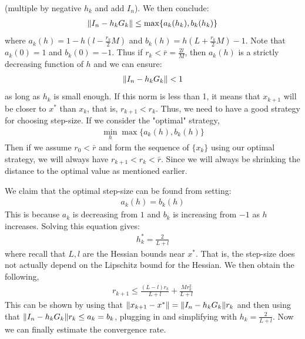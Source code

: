 \documentclass[12pt,a4paper]{article}
\begin{document}
	(multiple by negative $h_k$ and add $I_n$). We then conclude:
	\begin{align*}
		\norm{I_n - h_kG_k} \leq \max\{a_k(h_k), b_k(h_k)\}
	\end{align*}
	where $a_k(h) = 1 - h(l - \frac{r_k}{2}M)$ and $b_k(h) = h(L + \frac{r_k}{2}M) - 1$. 
	Note that $a_k(0) = 1$ and $b_k(0) = -1$. Thus if $r_k < \bar{r} = \frac{2l}{M}$, then $a_k(h)$ is a strictly decreasing function of $h$ and we can ensure:
	\begin{align*}
		\norm{I_n - h_kG_k} < 1
	\end{align*}
	as long as $h_k$ is small enough. If this norm is less than 1, it means that $x_{k+1}$ will be closer to $x^*$ than $x_k$, that is, $r_{k+1} < r_k$. Thus, we need to have a good strategy for choosing step-size. If we consider the "optimal" strategy,
	\begin{align*}
		\min_h \max\{a_k(h),b_k(h)\}
	\end{align*}
	Then if we assume $r_0 < \bar{r}$ and form the sequence of $\{x_k\}$ using our optimal strategy, we will always have $r_{k+1} < r_k < \bar{r}$. Since we will always be shrinking the distance to the optimal value as mentioned earlier. 
	
	We claim that the optimal step-size can be found from setting:
	\begin{align*}
		a_k(h) = b_k(h)
	\end{align*}
	This is because $a_k$ is decreasing from $1$ and $b_k$ is increasing from $-1$ as $h$ increases. Solving this equation gives:
	\begin{align*}
		h_k^* = \frac{2}{L+l}
	\end{align*}
	where recall that $L,l$ are the Hessian bounds near $x^*$. That is, the step-size does not actually depend on the Lipschitz bound for the Hessian. We then obtain the following,
	\begin{align*}
		r_{k+1} \leq \frac{(L-l)r_k}{L+l}+ \frac{Mr_k^2}{L+l}
	\end{align*}
	This can be shown by using that $\norm{x_{k+1} - x^*} = \norm{I_n - h_kG_k}r_k$ and then using that $\norm{I_n - h_kG_k}r_k \leq a_k = b_k$, plugging in and simplifying with $h_k = \frac{2}{L+l}$. Now we can finally estimate the convergence rate.
	
\end{document}
